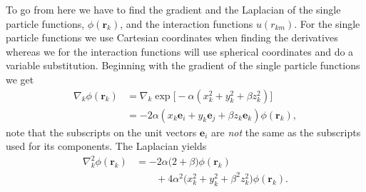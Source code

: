 \documentclass[
    a4paper, aps, twocolumn, floatfix, superscriptaddress]{revtex4-1}
\newcommand{\vf}{\mathbf}
\newcommand{\1}{\mathds{1}}
\begin{document}
            To go from here we have to find the gradient and the Laplacian of
            the single particle functions, $\phi(\vf{r}_k)$, and the interaction
            functions $u(r_{km})$. For the single particle functions we use
            Cartesian coordinates when finding the derivatives whereas we for
            the interaction functions will use spherical coordinates and do a
            variable substitution. Beginning with the gradient of the single
            particle functions we get
            \begin{align}
                \nabla_k\phi(\vf{r}_k)
                &=
                \nabla_k\exp\bigl[
                    -\alpha(x_k^2 + y_k^2 + \beta z_k^2)
                \bigr] \\
                &=
                -2\alpha
                (x_k\vf{e}_i + y_k\vf{e}_j + \beta z_k\vf{e}_k)
                \phi(\vf{r}_k),
            \end{align}
            note that the subscripts on the unit vectors $\vf{e}_i$ are
            \textit{not} the same as the subscripts used for its components. The
            Laplacian yields
            \begin{align}
                \nabla_k^2\phi(\vf{r}_k)
                &=
                -2\alpha
                \big(
                    2 + \beta
                \bigr)
                \phi(\vf{r}_k)
                \nonumber \\
                &\qquad
                + 4\alpha^2
                \bigl(
                    x_k^2 + y_k^2 + \beta^2z_k^2
                \bigr)
                \phi(\vf{r}_k).
            \end{align}
\end{document}
